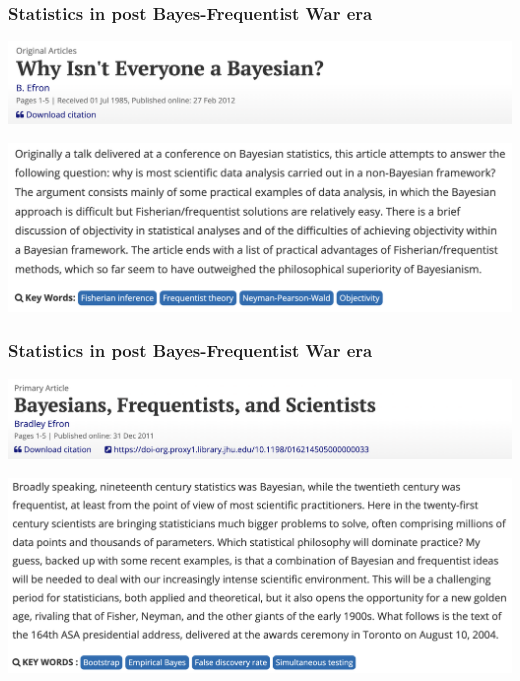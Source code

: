 \documentclass[18pt]{beamer}
\begin{document}
\begin{frame}
\frametitle{Statistics in post Bayes-Frequentist War era}
\includegraphics[width=\linewidth]{Figure/why_isnt_everyone_bayesian_top}
\vspace*{-.9\baselineskip}%

\includegraphics[width=\linewidth]{Figure/why_isnt_everyone_bayesian_bottom}
\end{frame}


\begin{frame}
\frametitle{Statistics in post Bayes-Frequentist War era}
\includegraphics[width=\linewidth]{Figure/bayes_freq_scientist_top}
\vspace*{-.9\baselineskip}%

\includegraphics[width=\linewidth]{Figure/bayes_freq_scientist_bottom}
\end{frame}

\end{document}

